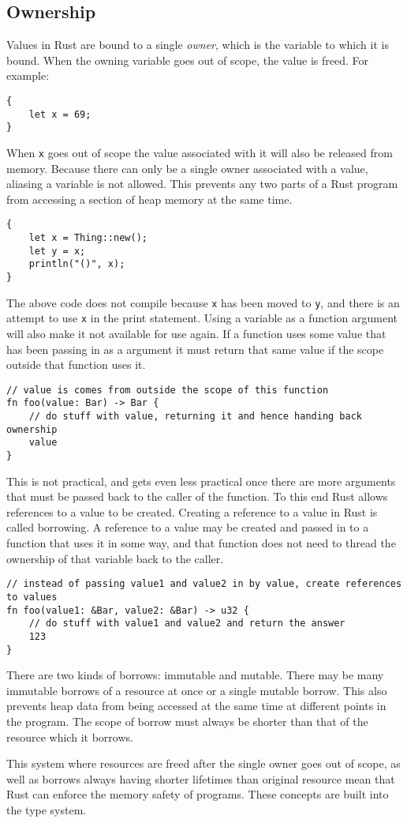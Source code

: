 \subsection{Ownership}\label{sec:regions}
Values in Rust are bound to a single \textit{owner}, which is the variable to
which it is bound. When the owning variable goes out of scope, the value is
freed. For example:
\begin{lstlisting}[nolol, label={lst:rustScope}]
{
    let x = 69;
}
\end{lstlisting}
When \lstinline{x} goes out of scope the value associated with it will also be
released from memory. Because there can only be a single owner associated with
a value, aliasing a variable is not allowed. This prevents any two parts
of a Rust program from accessing a section of heap memory at the same time.
\begin{lstlisting}[nolol, label={lst:rustScope}]
{
    let x = Thing::new();
    let y = x;
    println("()", x);
}
\end{lstlisting}
The above code does not compile because \lstinline{x} has been moved to
\lstinline{y}, and there is an attempt to use \lstinline{x} in the print
statement. Using a variable as a function argument will also make it not
available for use again. If a function uses some value that has been passing in
as a argument it must return that same value if the scope outside that
function uses it.
\begin{lstlisting}[nolol, label={lst:rustScope}]
// value is comes from outside the scope of this function
fn foo(value: Bar) -> Bar {
    // do stuff with value, returning it and hence handing back ownership
    value
}
\end{lstlisting}
This is not practical, and gets even less practical once there are more
arguments that must be passed back to the caller of the function. To this end
Rust allows references to a value to be created. Creating a reference to a value
in Rust is called borrowing. A reference to a value may be created and passed
in to a function that uses it in some way, and that function does not need to
thread the ownership of that variable back to the caller.
\begin{lstlisting}[nolol, label={lst:rustScope}]
// instead of passing value1 and value2 in by value, create references to values
fn foo(value1: &Bar, value2: &Bar) -> u32 {
    // do stuff with value1 and value2 and return the answer
    123
}
\end{lstlisting}
There are two kinds of borrows: immutable and mutable. There may be many
immutable borrows of a resource at once or a single mutable borrow. This also
prevents heap data from being accessed at the same time at different points in
the program. The scope of borrow must always be shorter than that of the
resource which it borrows. 

This system where resources are freed after the single owner goes out of scope,
as well as borrows always having shorter lifetimes than original resource
mean that Rust can enforce the memory safety of programs. These concepts are
built into the type system.
